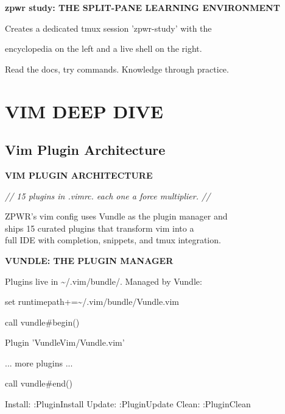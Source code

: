 \documentclass[11pt,a4paper,twoside]{book}
\begin{document}
\vspace{12pt}
{\bfseries\color{neonyellow} zpwr study: THE SPLIT-PANE LEARNING ENVIRONMENT}\vspace{4pt}

Creates a dedicated tmux session 'zpwr-study' with the

encyclopedia on the left and a live shell on the right.

Read the docs, try commands. Knowledge through practice.


\vspace{16pt}


\chapter{VIM DEEP DIVE}

\section{Vim Plugin Architecture}


\vspace{10pt}
{\large\bfseries\color{neoncyan} VIM PLUGIN ARCHITECTURE}\vspace{6pt}

{\small\itshape\color{dimtext} // 15 plugins in .vimrc. each one a force multiplier. //}

\begin{codebox}
ZPWR's vim config uses Vundle as the plugin manager and\\
ships 15 curated plugins that transform vim into a\\
full IDE with completion, snippets, and tmux integration.\\
\end{codebox}


\vspace{12pt}
{\bfseries\color{neonyellow} VUNDLE: THE PLUGIN MANAGER}\vspace{4pt}

Plugins live in \textasciitilde{}/.vim/bundle/. Managed by Vundle:

set runtimepath+=\textasciitilde{}/.vim/bundle/Vundle.vim

call vundle\#begin()

Plugin 'VundleVim/Vundle.vim'

... more plugins ...

call vundle\#end()

Install: :PluginInstall  Update: :PluginUpdate  Clean: :PluginClean
\end{document}
